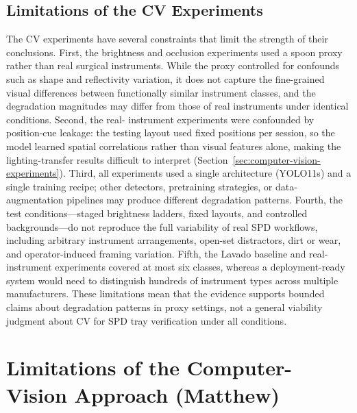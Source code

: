 \documentclass[10pt,a4paper]{article}
\begin{document}
\subsection{Limitations of the CV Experiments}

The CV experiments have several constraints that limit the strength of
their conclusions. First, the brightness and occlusion experiments used a
spoon proxy rather than real surgical instruments. While the proxy
controlled for confounds such as shape and reflectivity variation, it does
not capture the fine-grained visual differences between functionally
similar instrument classes, and the degradation magnitudes may differ from
those of real instruments under identical conditions. Second, the real-
instrument experiments were confounded by position-cue leakage: the
testing layout used fixed positions per session, so the model learned
spatial correlations rather than visual features alone, making the
lighting-transfer results difficult to interpret (Section~\ref{sec:computer-vision-experiments}).
Third, all experiments used a single architecture (YOLO11s) and a single
training recipe; other detectors, pretraining strategies, or data-
augmentation pipelines may produce different degradation patterns. Fourth,
the test conditions---staged brightness ladders, fixed layouts, and
controlled backgrounds---do not reproduce the full variability of real SPD
workflows, including arbitrary instrument arrangements, open-set
distractors, dirt or wear, and operator-induced framing variation. Fifth,
the Lavado baseline and real-instrument experiments covered at most six
classes, whereas a deployment-ready system would need to distinguish
hundreds of instrument types across multiple manufacturers. These
limitations mean that the evidence supports bounded claims about
degradation patterns in proxy settings, not a general viability judgment
about CV for SPD tray verification under all conditions.


\section{Limitations of the Computer-Vision Approach \hfill {\normalfont\small (Matthew)}}
\label{sec:limitations-of-cv}
\label{sec:reason-for-pivot}
\end{document}
